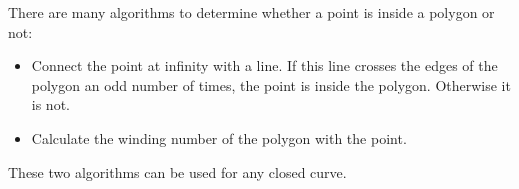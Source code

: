 \documentclass[12pt]{article}
\begin{document}
There are many algorithms to determine whether a point is inside a
polygon or not:

\begin{itemize}
\item Connect the point at infinity with a line. If this line
crosses the edges of the polygon an odd number of times, the point
is inside the polygon. Otherwise it is not.
\item Calculate the winding number of the polygon with the
point.
\end{itemize}

These two algorithms can be used for any closed curve.
\end{document}
